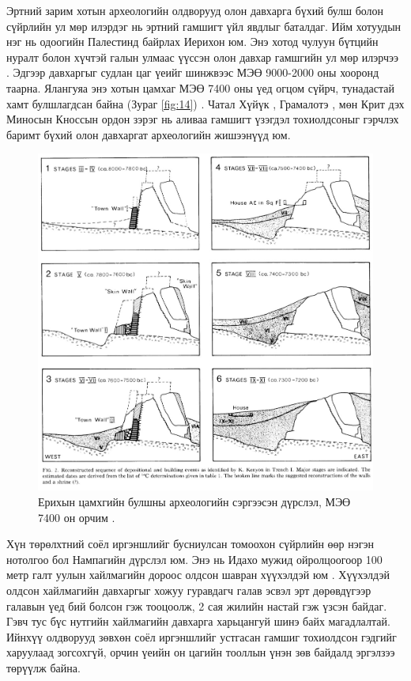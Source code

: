 \documentclass[10pt,twocolumn,letterpaper]{article}
\begin{document}
Эртний зарим хотын археологийн олдворууд олон давхарга бүхий булш болон сүйрлийн ул мөр илэрдэг нь эртний гамшигт үйл явдлыг баталдаг. Ийм хотуудын нэг нь одоогийн Палестинд байрлах Иерихон юм. Энэ хотод чулуун бүтцийн нуралт болон хүчтэй галын улмаас үүссэн олон давхар гамшгийн ул мөр илэрчээ \cite{96,97}. Эдгээр давхаргыг судлан цаг үеийг шинжвээс МЭӨ 9000-2000 оны хооронд таарна. Ялангуяа энэ хотын цамхаг МЭӨ 7400 оны үед огцом сүйрч, тунадастай хамт булшлагдсан байна (Зураг \ref{fig:14}) \cite{95}. Чатал Хүйүк \cite{99}, Грамалотэ \cite{98}, мөн Крит дэх Миносын Кноссын ордон \cite{100,101} зэрэг нь аливаа гамшигт үзэгдэл тохиолдсоныг гэрчлэх баримт бүхий олон давхаргат археологийн жишээнүүд юм.

\begin{figure}[t]
\begin{center}

   \includegraphics[width=1\linewidth]{jericho.jpg}
\end{center}
   \caption{Ерихын цамхгийн булшны археологийн сэргээсэн дүрслэл, МЭӨ 7400 он орчим \cite{95}.}
\label{fig:14}
\label{fig:onecol}
\end{figure}

Хүн төрөлхтний соёл иргэншлийг бусниулсан томоохон сүйрлийн өөр нэгэн нотолгоо бол Нампагийн дүрслэл юм. Энэ нь Идахо мужид ойролцоогоор 100 метр галт уулын хайлмагийн дороос олдсон шавран хүүхэлдэй юм \cite{102,103}. Хүүхэлдэй олдсон хайлмагийн давхаргыг хожуу гуравдагч галав эсвэл эрт дөрөвдүгээр галавын үед бий болсон гэж тооцоолж, 2 сая жилийн настай гэж үзсэн байдаг. Гэвч тус бүс нутгийн хайлмагийн давхарга харьцангуй шинэ байх магадлалтай. Ийнхүү олдворууд зөвхөн соёл иргэншлийг устгасан гамшиг тохиолдсон гэдгийг харуулаад зогсохгүй, орчин үеийн он цагийн тооллын үнэн зөв байдалд эргэлзээ төрүүлж байна.
\end{document}

